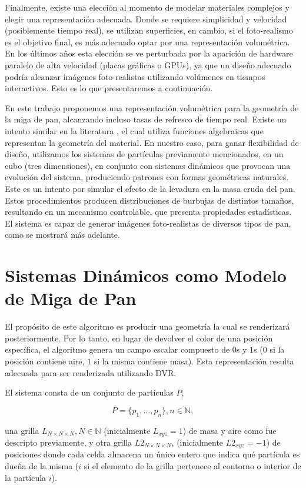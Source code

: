 \documentclass[spanish,a4paper,11pt,oneside,links]{report}
\begin{document}
Finalmente, existe una elección al momento de modelar materiales complejos y elegir una representación adecuada.
Donde se requiere simplicidad y velocidad (posiblemente tiempo real), se utilizan superficies, en cambio, si el foto-realismo es el objetivo final, es más adecuado optar por una representación volumétrica.
En los últimos años esta elección se ve perturbada por la aparición de hardware paralelo de alta velocidad (placas gráficas o GPUs), ya que un diseño adecuado podría alcanzar imágenes foto-realistas utilizando volúmenes en tiempos interactivos.
Esto es lo que presentaremos a continuación.


En este trabajo proponemos una representación volumétrica para la geometría de la miga de pan, alcanzando incluso tasas de refresco de tiempo real.
Existe un intento similar en la literatura \cite{Perlin1989}, el cual utiliza funciones algebraicas que representan la geometría del material.
En nuestro caso, para ganar flexibilidad de diseño, utilizamos los sistemas de partículas previamente mencionados, en un cubo (tres dimensiones), en conjunto con sistemas dinámicos \cite{Strogatz2001} que provocan una evolución del sistema, produciendo patrones con formas geométricas naturales.
Este es un intento por simular el efecto de la levadura en la masa cruda del pan.
Estos procedimientos producen distribuciones de burbujas de distintos tamaños, resultando en un mecanismo controlable, que presenta propiedades estadísticas.
El sistema es capaz de generar imágenes foto-realistas de diversos tipos de pan, como se mostrará más adelante.

\section{Sistemas Dinámicos como Modelo de Miga de Pan}
El prop\'osito de este algoritmo es producir una geometr\'ia la cual se renderizar\'a posteriormente. Por lo tanto, en lugar de devolver el color de una posici\'on espec\'ifica, el algoritmo genera un campo escalar compuesto de $0$s y $1$s ($0$ si la posici\'on contiene aire, $1$ si la misma contiene masa).
Esta representaci\'on resulta adecuada para ser renderizada utilizando DVR.

El sistema consta de un conjunto de part\'iculas $P$,

\begin{equation}
  P = \{p_{1}, ... , p_{n}\}, n  \in \mathbb{N},
\end{equation}

\noindent una grilla $L_{N\times N \times N}, N \in \mathbb{N} $ (inicialmente $L_{xyz}=1$) de masa y aire como fue descripto previamente, y otra grilla $L2_{N\times N \times N}$, (inicialmente $L2_{xyz}=-1$) de posiciones donde cada celda almacena un único entero que indica qu\'e part\'icula es due\~na de la misma ($i$ si el elemento de la grilla pertenece al contorno o interior de la part\'icula $i$).
\end{document}
